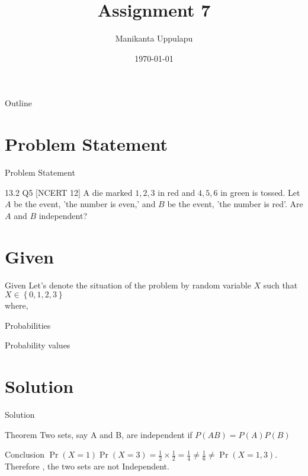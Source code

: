 \documentclass{beamer}
\title{Assignment 7}
\author{Manikanta Uppulapu}
\date{\today}
\providecommand{\cbrak}[1]{\ensuremath{\left\{#1\right\}}}
\providecommand{\cbrak}[1]{\ensuremath{\left\{#1\right\}}}
\begin{document}
\begin{frame}
    \titlepage 
\end{frame}

\logo{}


\begin{frame}{Outline}
    \tableofcontents
\end{frame}



\section{Problem Statement}
\begin{frame}{Problem Statement}
    \begin{block}{13.2 Q5 [NCERT 12] }A die marked $1, 2, 3$ in red and $4, 5, 6$ in green is tossed. Let $A$ be the event, 'the number is even,' and $B$ be the event, 'the number is red'. Are $A$ and $B$ independent?
    \end{block}
\end{frame}



\section{Given}
\begin{frame}{Given}
Let's denote the situation of the problem by random variable $X$  such that $X\in \cbrak{0,1,2,3}$\\
where,\\
\begin{table}[ht!]
    \centering
    
    \caption{}
\label{table:table1}
\end{table}

  
\end{frame}

\begin{frame}{Probabilities}
\begin{table}[ht!]
    \centering
    
    \caption{Probability values}
\label{table:table2}
\end{table}

\end{frame}

\section{Solution}
\begin{frame}{Solution}
\begin{exampleblock}{Theorem}
        Two sets, say A and B, are independent if $P(AB) = P(A)P(B)$
   \end{exampleblock}
   \begin{block}{Conclusion}
        $\Pr(X=1)\Pr(X=3) = \frac{1}{2} \times \frac{1}{2} =   \frac{1}{4} \neq \frac{1}{6} \neq \Pr(X=1,3)$.\\
        Therefore , the two sets are not Independent.
    \end{block}

\end{frame}
\end{document}
